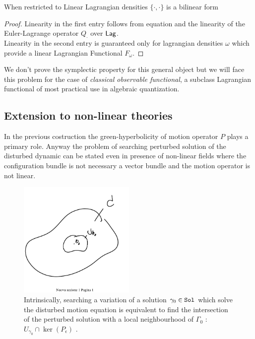 \documentclass[Main]{subfiles}
\begin{document}
		\begin{proposition}[Bilinearity]
			When restricted to Linear Lagrangian densities $\{\cdot,\cdot\}$ is a bilinear form
		\end{proposition}
		\begin{proof}
			Linearity in the first entry follows from equation \cite{Perturbation} and the linearity of the Euler-Lagrange operator $Q_\cdot$ over $\mathsf{Lag}$.
			\\
			Linearity in the second entry is guaranteed only for lagrangian densities $\omega$ which provide a linear Lagrangian Functional $F_\omega$.
		\end{proof}
		We don't prove the symplectic property for this general object but we will face this problem for the case of  \emph{classical observable functional}, a subclass Lagrangian functional of most practical use in algebraic quantization.

	\subsection{Extension to non-linear theories}
		In the previous costruction the green-hyperbolicity of motion operator $P$ plays a primary role.
		Anyway the problem of searching perturbed solution of the disturbed dynamic can be stated even in presence  of non-linear fields  where the configuration bundle is not necessary a vector bundle and the motion operator is not linear.
		\begin{figure}[h!]
				  \centering
   	\includegraphics[width=0.5\textwidth]{Pictures/Linearization} 
   	  \caption{Intrinsically, searching a variation of a solution $\gamma_0\in \mathtt{Sol}$ which solve the disturbed motion equation is equivalent to find the intersection of the perturbed solution with a local neighbourhood of $\Gamma_0$ : $U_{\gamma_0}\cap\ker(P_\epsilon)$ .}
		\end{figure}		
		
\end{document}
